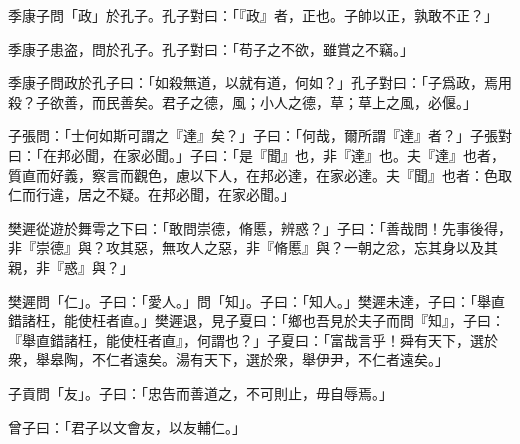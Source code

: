 季康子問「政」於孔子。孔子對曰：「『政』者，正也。子帥以正，孰敢不正？」

季康子患盗，問於孔子。孔子對曰：「苟子之不欲，雖賞之不竊。」

季康子問政於孔子曰：「如殺無道，以就有道，何如？」孔子對曰：「子爲政，焉用殺？子欲善，而民善矣。君子之德，風；小人之德，草；草上之風，必偃。」

子張問：「士何如斯可謂之『達』矣？」子曰：「何哉，爾所謂『達』者？」子張對曰：「在邦必聞，在家必聞。」子曰：「是『聞』也，非『達』也。夫『達』也者，質直而好義，察言而觀色，慮以下人，在邦必達，在家必達。夫『聞』也者：色取仁而行違，居之不疑。在邦必聞，在家必聞。」

樊遲從遊於舞雩之下曰：「敢問崇德，脩慝，辨惑？」子曰：「善哉問！先事後得，非『崇德』與？攻其惡，無攻人之惡，非『脩慝』與？一朝之忿，忘其身以及其親，非『惑』與？」

樊遲問「仁」。子曰：「愛人。」問「知」。子曰：「知人。」樊遲未達，子曰：「舉直錯諸枉，能使枉者直。」樊遲退，見子夏曰：「鄉也吾見於夫子而問『知』，子曰：『舉直錯諸枉，能使枉者直』，何謂也？」子夏曰：「富哉言乎！舜有天下，選於衆，舉皋陶，不仁者遠矣。湯有天下，選於衆，舉伊尹，不仁者遠矣。」

子貢問「友」。子曰：「忠告而善道之，不可則止，毋自辱焉。」

曾子曰：「君子以文會友，以友輔仁。」
